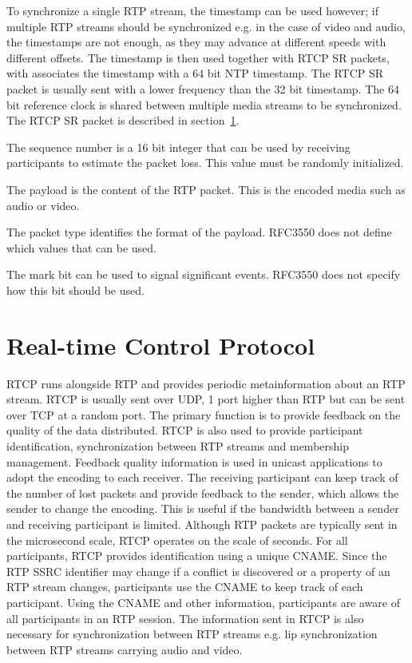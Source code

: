 To synchronize a single RTP stream, the timestamp can be used however; if multiple RTP streams should be synchronized e.g. in the case of video and audio, the timestamps are not enough, as they may advance at different speeds with different offsets. The timestamp is then used together with RTCP SR packets, with associates the timestamp with a 64 bit NTP timestamp. The RTCP SR packet is usually sent with a lower frequency than the 32 bit timestamp. The 64 bit reference clock is shared between multiple media streams to be synchronized. The RTCP SR packet is described in section~\ref{sec:design:rtcp}.


The sequence number is a 16 bit integer that can be used by receiving participants to estimate the packet loss. This value must be randomly initialized.

The payload is the content of the RTP packet. This is the encoded media such as audio or video. 

The packet type identifies the format of the payload. RFC3550 does not define which values that can be used.


The mark bit can be used to signal significant events. RFC3550 does not specify how this bit should be used.



\section{Real-time Control Protocol} \label{sec:design:rtcp}
RTCP runs alongside RTP and provides periodic metainformation about an RTP stream. RTCP is usually sent over UDP, 1 port higher than RTP but can be sent over TCP at a random port. The primary function is to provide feedback on the quality of the data distributed. RTCP is also used to provide participant identification, synchronization between RTP streams and membership management. Feedback quality information is used in unicast applications to adopt the encoding to each receiver. The receiving participant can keep track of the number of lost packets and provide feedback to the sender, which allows the sender to change the encoding. This is useful if the bandwidth between a sender and receiving participant is limited.  Although RTP packets are typically sent in the microsecond scale, RTCP operates on the scale of seconds.
For all participants, RTCP provides identification using a unique \ac{CNAME}.
Since the RTP SSRC identifier may change if a conflict is discovered or a property of an RTP stream changes, participants use the CNAME to keep track of each participant. Using the \ac{CNAME} and other information, participants are aware of all participants in an RTP session.
The information sent in RTCP is also necessary for synchronization between RTP streams e.g. lip synchronization between RTP streams carrying audio and video.

